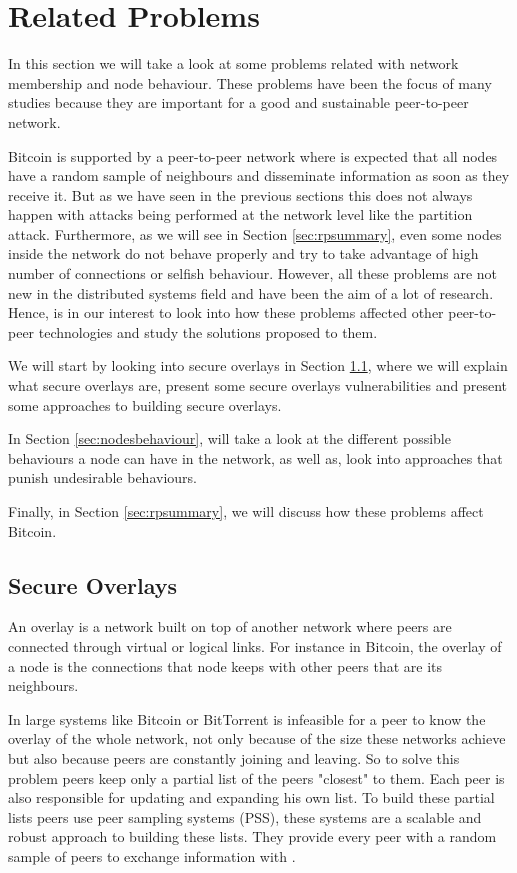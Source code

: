 \section{Related Problems}
\label{sec:rproblems}
In this section we will take a look at some problems related with network membership and node behaviour. These problems have been the focus of many studies because they are important for a good and sustainable peer-to-peer network.

Bitcoin is supported by a peer-to-peer network where is expected that all nodes have a random sample of neighbours and disseminate information as soon as they receive it. But as we have seen in the previous sections this does not always happen with attacks being performed at the network level like the partition attack. Furthermore, as we will see in Section \ref{sec:rpsummary}, even some nodes inside the network do not behave properly and try to take advantage of high number of connections or selfish behaviour. However, all these problems are not new in the distributed systems field and have been the aim of a lot of research. Hence, is in our interest to look into how these problems affected other peer-to-peer technologies and study the solutions proposed to them.

We will start by looking into secure overlays in Section \ref{sec:secureoverlays}, where we will explain what secure overlays are, present some secure overlays vulnerabilities and present some approaches to building secure overlays.

In Section \ref{sec:nodesbehaviour}, will take a look at the different possible behaviours a node can have in the network, as well as, look into approaches that punish undesirable behaviours.

Finally, in Section \ref{sec:rpsummary}, we will discuss how these problems affect Bitcoin.

\subsection{Secure Overlays}
\label{sec:secureoverlays}
An overlay is a network built on top of another network where peers are connected through virtual or logical links. For instance in Bitcoin, the overlay of a node is the connections that node keeps with other peers that are its neighbours.

In large systems like Bitcoin or BitTorrent is infeasible for a peer to know the overlay of the whole network, not only because of the size these networks achieve but also because peers are constantly joining and leaving. So to solve this problem peers keep only a partial list of the peers "closest" to them. Each peer is also responsible for updating and expanding his own list. To build these partial lists peers use peer sampling systems (PSS), these systems are a scalable and robust approach to building these lists. They provide every peer with a random sample of
peers to exchange information with \cite{jelasity2004peer}.

